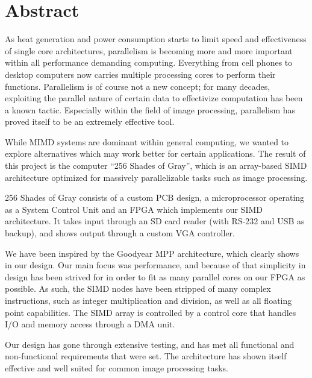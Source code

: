 \begingroup
\let\clearpage\relax
\let\cleardoublepage\relax
\let\cleardoublepage\relax

\chapter*{Abstract}
As heat generation and power consumption starts to limit speed and effectiveness
of single core architectures, parallelism is becoming more and more important
within all performance demanding computing. Everything from cell phones to
desktop computers now carries multiple processing cores to perform their
functions. Parallelism is of course not a new concept; for many decades,
exploiting the parallel nature of certain data to effectivize computation has
been a known tactic. Especially within the field of image processing,
parallelism has proved itself to be an extremely effective tool.

While \ac{MIMD} systems are dominant within general computing, we wanted to
explore alternatives which may work better for certain applications. The result
of this project is the computer ``256 Shades of Gray'', which is an array-based
\ac{SIMD} architecture optimized for massively parallelizable tasks such as
image processing.

256 Shades of Gray consists of a custom PCB design, a microprocessor operating
as a System Control Unit and an FPGA which implements our SIMD architecture. It
takes input through an SD card reader (with RS-232 and USB as backup), and shows
output through a custom VGA controller.

We have been inspired by the Goodyear MPP architecture, which clearly shows in
our design. Our main focus was performance, and because of that simplicity in
design has been strived for in order to fit as many parallel cores on our FPGA
as possible. As such, the SIMD nodes have been stripped of many
complex instructions, such as integer multiplication and division, as well as
all floating point capabilities. The SIMD array is controlled by a control core
that handles I/O and memory access through a DMA unit.

Our design has gone through extensive testing, and has met all functional and
non-functional requirements that were set. The architecture has shown itself
effective and well suited for common image processing tasks.
\endgroup
